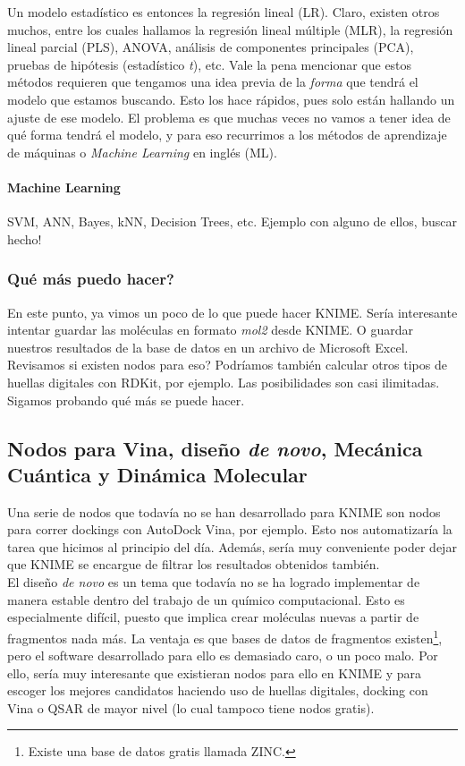 \documentclass[10pt,letterpaper]{article}
\begin{document}
Un modelo estad\'istico es entonces la regresi\'on lineal (LR). Claro, existen otros muchos, entre los cuales hallamos la regresi\'on lineal m\'ultiple (MLR), la regresi\'on lineal parcial (PLS), ANOVA, an\'alisis de componentes principales (PCA), pruebas de hip\'otesis (estad\'istico \emph{t}), etc. Vale la pena mencionar que estos m\'etodos requieren que tengamos una idea previa de la \textit{forma} que tendr\'a el modelo que estamos buscando. Esto los hace r\'apidos, pues solo est\'an hallando un ajuste de ese modelo. El problema es que muchas veces no vamos a tener idea de qu\'e forma tendr\'a el modelo, y para eso recurrimos a los m\'etodos de aprendizaje de m\'aquinas o \emph{Machine Learning} en ingl\'es (ML).

\paragraph{Machine Learning}

SVM, ANN, Bayes, kNN, Decision Trees, etc.
Ejemplo con alguno de ellos, buscar hecho!

\subsubsection{Qu\'e m\'as puedo hacer?}
En este punto, ya vimos un poco de lo que puede hacer KNIME. Ser\'ia interesante intentar guardar las mol\'eculas en formato \emph{mol2} desde KNIME. O guardar nuestros resultados de la base de datos en un archivo de Microsoft Excel. Revisamos si existen nodos para eso? Podr\'iamos tambi\'en calcular otros tipos de huellas digitales con RDKit, por ejemplo. Las posibilidades son casi ilimitadas. Sigamos probando qu\'e m\'as se puede hacer.

\subsection{Nodos para Vina, dise\~no \emph{de novo}, Mec\'anica Cu\'antica y Din\'amica Molecular}
Una serie de nodos que todav\'ia no se han desarrollado para KNIME son nodos para correr dockings con AutoDock Vina, por ejemplo. Esto nos automatizar\'ia la tarea que hicimos al principio del d\'ia. Adem\'as, ser\'ia muy conveniente poder dejar que KNIME se encargue de filtrar los resultados obtenidos tambi\'en.\\

El dise\~no \emph{de novo} es un tema que todav\'ia no se ha logrado implementar de manera estable dentro del trabajo de un qu\'imico computacional. Esto es especialmente dif\'icil, puesto que implica crear mol\'eculas nuevas a partir de fragmentos nada m\'as. La ventaja es que bases de datos de fragmentos existen\footnote{Existe una base de datos gratis llamada ZINC.}, pero el software desarrollado para ello es demasiado caro, o un poco malo. Por ello, ser\'ia muy interesante que existieran nodos para ello en KNIME y para escoger los mejores candidatos haciendo uso de huellas digitales, docking con Vina o QSAR de mayor nivel (lo cual tampoco tiene nodos gratis).\\
\end{document}
